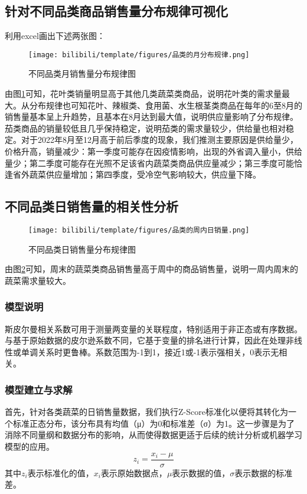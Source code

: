 \documentclass[withoutpreface,bwprint]{cumcmthesis} %
\begin{document}
\subsection{针对不同品类商品销售量分布规律可视化}
利用excel画出下述两张图：
\begin{figure}[H]%
	\centering
	\texttt{[image: bilibili/template/figures/品类的月分布规律.png]}%
    \caption{不同品类月销售量分布规律图}
    \label{不同品类分布规律图}%
\end{figure}
由图\ref{不同品类分布规律图}可知，花叶类销量明显高于其他几类蔬菜类商品，说明花叶类的需求量最大。从分布规律也可知花叶、辣椒类、食用菌、水生根茎类商品在每年的6至8月的销售量基本呈上升趋势，且基本在8月达到最大值，说明供应量影响了分布规律。茄类商品的销量较低且几乎保持稳定，说明茄类的需求量较少，供给量也相对稳定。对于2022年8月至12月高于前后季度的现象，我们推测主要原因是供给量少，价格升高，销量减少：第一季度可能存在因疫情影响，出现的外省调入量小，供给量少；第二季度可能存在光照不足该省内蔬菜类商品供应量减少；第三季度可能恰逢省外蔬菜供应量增加；第四季度，受冷空气影响较大，供应量下降。


\subsection{不同品类日销售量的相关性分析}
\begin{figure}[H]%
	\centering
	\texttt{[image: bilibili/template/figures/品类的周内日销量.png]}%
    \caption{不同品类日销售量分布规律图}
    \label{日销量}%
\end{figure}
由图\ref{日销量}可知，周末的蔬菜类商品销售量高于周中的商品销售量，说明一周内周末的蔬菜需求量较大。

\subsubsection{模型说明}
斯皮尔曼相关系数可用于测量两变量的关联程度，特别适用于非正态或有序数据。与基于原始数据的皮尔逊系数不同，它基于变量的排名进行计算，因此在处理非线性或单调关系时更鲁棒。系数范围为-1到1，接近1或-1表示强相关，0表示无相关。

\subsubsection{模型建立与求解}
首先，针对各类蔬菜的日销售量数据，我们执行Z-Score标准化以便将其转化为一个标准正态分布，该分布具有均值（μ）为0和标准差（σ）为1。这一步骤是为了消除不同量纲和数据分布的影响，从而使得数据更适于后续的统计分析或机器学习模型的应用。
\begin{equation}
	z_{i}=\dfrac{x_{i}-\mu }{\sigma }
\end{equation}
其中$z_{i}$表示标准化的值，$x_{i}$表示原始数据点，$\mu$表示数据的值，$\sigma$表示数据的标准差。
\end{document}
